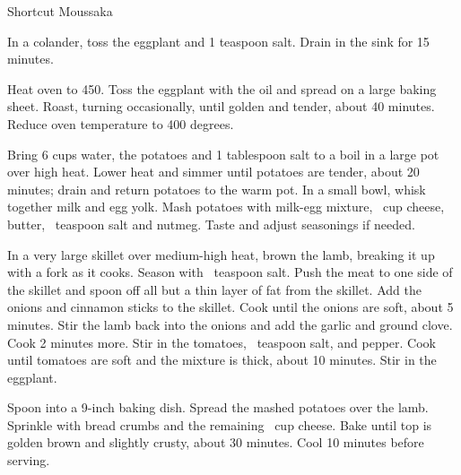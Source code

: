 \begin{recipe}{Shortcut Moussaka}

    \begin{ingredients}
    \end{ingredients}

    \begin{instructions}
        In a colander, toss the eggplant and 1 teaspoon salt.
        Drain in the sink for 15 minutes.

        Heat oven to 450\degF.
        Toss the eggplant with the oil and spread on a large baking sheet.
        Roast, turning occasionally, until golden and tender, about 40 minutes.
        Reduce oven temperature to 400 degrees.

        Bring 6 cups water, the potatoes and 1 tablespoon salt to a boil in a large pot over high heat.
        Lower heat and simmer until potatoes are tender, about 20 minutes; drain and return potatoes to the warm pot.
        In a small bowl, whisk together milk and egg yolk.
        Mash potatoes with milk-egg mixture, \half~cup cheese, butter, \quarter~teaspoon salt and nutmeg.
        Taste and adjust seasonings if needed.

        In a very large skillet over medium-high heat, brown the lamb, breaking it up with a fork as it cooks.
        Season with \quarter~teaspoon salt.
        Push the meat to one side of the skillet and spoon off all but a thin layer of fat from the skillet.
        Add the onions and cinnamon sticks to the skillet.
        Cook until the onions are soft, about 5 minutes.
        Stir the lamb back into the onions and add the garlic and ground clove.
        Cook 2 minutes more.
        Stir in the tomatoes, \half~teaspoon salt, and pepper.
        Cook until tomatoes are soft and the mixture is thick, about 10 minutes.
        Stir in the eggplant.

        Spoon into a 9-inch baking dish.
        Spread the mashed potatoes over the lamb.
        Sprinkle with bread crumbs and the remaining \quarter~cup cheese.
        Bake until top is golden brown and slightly crusty, about 30 minutes.
        Cool 10 minutes before serving.
    \end{instructions}
\end{recipe}
